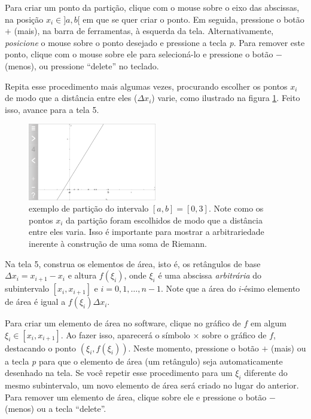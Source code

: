 \documentclass[a4paper,12pt]{scrartcl}
\begin{document}
\begin{list}{.}
      Para criar um ponto da partição, clique com o mouse sobre o eixo das abscissas, na posição $x_i \in ]a,b[$ em que se quer criar o ponto. Em seguida, pressione o botão $+$ (mais), na barra de ferramentas, à esquerda da tela. Alternativamente, \emph{posicione} o mouse sobre o ponto desejado e pressione a tecla \textit{p}. Para remover este ponto, clique com o mouse sobre ele para selecioná-lo e pressione o botão $-$ (menos), ou pressione ``delete'' no teclado.
      
      Repita esse procedimento mais algumas vezes, procurando escolher os pontos $x_i$ de modo que a distância entre eles ($\Delta x_i$) varie, como ilustrado na figura \ref{fig:particao}. Feito isso, avance para a tela 5.
      
      \begin{figure}
	\centering
	\includegraphics[width=0.5\textwidth]{particao.png}
	\caption{exemplo de partição do intervalo $[a,b] = [0,3]$. Note como os pontos $x_i$ da partição foram escolhidos de modo que a distância entre eles varia. Isso é importante para mostrar a arbitrariedade inerente à construção de uma soma de Riemann.}
	\label{fig:particao}
      \end{figure}

      \item Na tela 5, construa os elementos de área, isto é, os retângulos de base $\Delta x_i = x_{i+1} - x_i$ e altura $f(\xi_i)$, onde $\xi_i$
      é uma abscissa \emph{arbitrária} do subintervalo $[x_i, x_{i+1}]$ e $i = 0,1,\ldots,n-1$. Note que a área do $i$-ésimo elemento de área é igual a $f(\xi_i)\Delta x_i$.
      
      Para criar um elemento de área no software, clique no gráfico de $f$ em algum $\xi_i \in [x_i,x_{i+1}]$. Ao fazer isso, aparecerá o símbolo $\times$ sobre o gráfico de $f$, destacando o ponto $\left(\xi_i, f(\xi_i)\right)$. Neste momento, pressione o botão $+$ (mais) ou a tecla \textit{p} para que o elemento de área (um retângulo) seja automaticamente desenhado na tela. Se você repetir esse procedimento para um $\xi_i$ diferente do mesmo subintervalo, um novo elemento de área será criado no lugar do anterior. Para remover um elemento de área, clique sobre ele e pressione o botão $-$ (menos) ou a tecla ``delete''.
      

\end{list}
\end{document}
